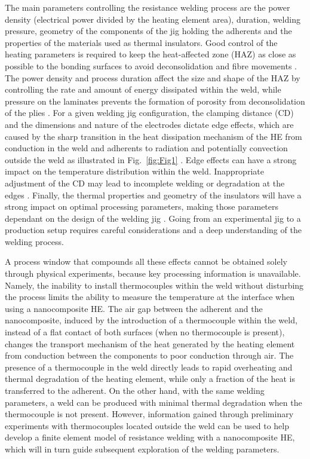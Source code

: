 \documentclass[review,times,sagev,doublespace]{sagej}
\begin{document}
The main parameters controlling the resistance welding process are the power density (electrical power divided by the heating element area), duration, welding pressure, geometry of the components of the jig holding the adherents and the properties of the materials used as thermal insulators. 
Good control of the heating parameters is required to keep the heat-affected zone (HAZ) as close as possible to the bonding surfaces to avoid deconsolidation and fibre movements \cite{Stavrov2005a}. 
The power density and process duration affect the size and shape of the HAZ by controlling the rate and amount of energy dissipated within the weld, while pressure on the laminates prevents the formation of porosity from deconsolidation of the plies \cite{Shi2017}. 
For a given welding jig configuration, the clamping distance {(CD)} and the dimensions and nature of the electrodes dictate edge effects, which are caused by the sharp transition in the heat dissipation mechanism of the HE from conduction in the weld and adherents to radiation and potentially convection outside the weld as illustrated in Fig.~\ref{fig:Fig1} \cite{Ageorges2001b}. 
Edge effects can have a strong impact on the temperature distribution within the weld. 
Inappropriate adjustment of the {CD} may lead to incomplete welding or degradation at the edges \cite{Talbot2013}. 
Finally, the thermal properties and geometry of the insulators will have a strong impact on optimal processing parameters, making those parameters dependant on the design of the welding jig \cite{Talbot2013,Ageorges2001b,Colak2002,Shi2015a}. 
Going from an experimental jig to a production setup requires careful considerations and a deep understanding of the welding process. 

A process window that compounds all these effects cannot be obtained solely through physical experiments, because key processing information is unavailable. 
Namely, the inability to install thermocouples within the weld without disturbing the process limits the ability to measure the temperature at the interface when using a nanocomposite HE. 
{
The air gap between the adherent and the nanocomposite, induced by the introduction of a thermocouple within the weld, instead of a flat contact of both surfaces (when no thermocouple is present), changes the transport mechanism of the heat generated by the heating element from conduction between the components to poor conduction through air. 
The presence of a thermocouple in the weld directly leads to rapid overheating and thermal degradation of the heating element, while only a fraction of the heat is transferred to the adherent. 
On the other hand, with the same welding parameters, a weld can be produced with minimal thermal degradation when the thermocouple is not present. 
}
However, information gained through preliminary experiments{ with thermocouples located outside the weld} can be used to help develop a finite element model of resistance welding with a nanocomposite HE, which will in turn guide subsequent exploration of the welding parameters. 
\end{document}

